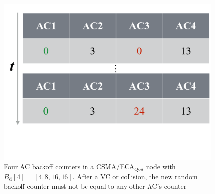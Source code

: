 	\begin{figure}[tb]
	\centering
		\includegraphics[width=0.5\linewidth]{figures/smartBackoff1.pdf}
		\caption{Four AC backoff counters in a CSMA/ECA$_{\text{QoS}}$ node with $B_{\text{d}}[4]=[4,8,16,16]$. After a VC or collision, the new random backoff counter must not be equal to any other AC's counter}
		\label{fig:smartBackoff1}
	\end{figure}
